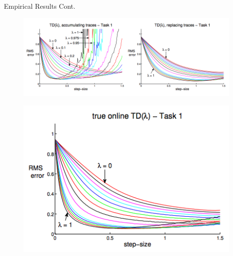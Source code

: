 \documentclass[xcolor={table}]{beamer}
\begin{document}
\begin{frame}{Empirical Results Cont.}
    \begin{figure}
        \centering
        \includegraphics[scale = 0.33]{fig2-1.png}
        \label{fig:my_label}
    \end{figure}
    \begin{figure}
        \centering
        \includegraphics[scale = 0.33]{fig2-2.png}
        \label{fig:my_label}
    \end{figure}
\end{frame}
\end{document}
